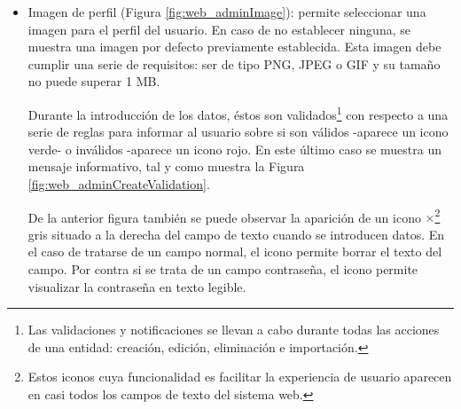 \documentclass[12pt,a4paper, twoside]{report}
\begin{document}
\begin{itemize}
\begin{itemize}
		
			\item Imagen de perfil (Figura \ref{fig:web_adminImage}): permite seleccionar una imagen para el perfil del usuario. En caso de no establecer ninguna, se muestra una imagen por defecto previamente establecida. Esta imagen debe cumplir una serie de requisitos: ser de tipo PNG, JPEG o GIF y su tamaño no puede superar 1 MB.
			
			
			Durante la introducción de los datos, éstos son validados\footnote{Las validaciones y notificaciones se llevan a cabo durante todas las acciones de una entidad: creación, edición, eliminación e importación.} con respecto a una serie de reglas para informar al usuario sobre si son válidos -aparece un icono verde- o inválidos -aparece un icono rojo. En este último caso se muestra un mensaje informativo, tal y como muestra la Figura \ref{fig:web_adminCreateValidation}.
			
			
			De la anterior figura también se puede observar la aparición de un icono $\times$\footnote{Estos iconos cuya funcionalidad es facilitar la experiencia de usuario aparecen en casi todos los campos de texto del sistema web.} gris situado a la derecha del campo de texto cuando se introducen datos. En el caso de tratarse de un campo normal, el icono permite borrar el texto del campo. Por contra si se trata de un campo contraseña, el icono permite visualizar la contraseña en texto legible.
			

\end{itemize}
\end{itemize}
\end{document}
